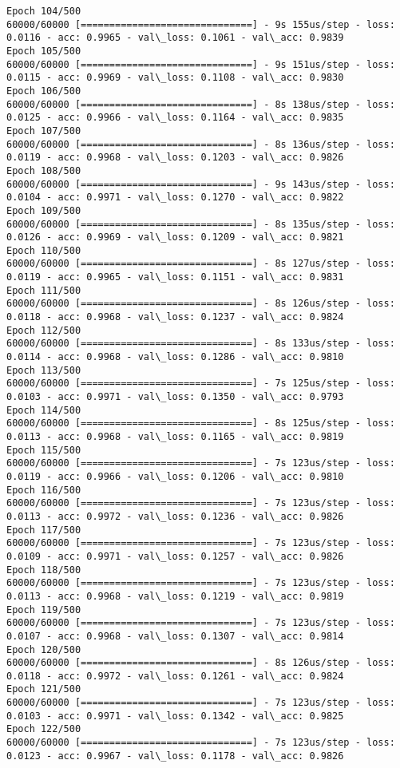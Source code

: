 \documentclass[11pt]{article}
\begin{document}
\begin{Verbatim}[commandchars=\\\{\}]
Epoch 104/500
60000/60000 [==============================] - 9s 155us/step - loss: 0.0116 - acc: 0.9965 - val\_loss: 0.1061 - val\_acc: 0.9839
Epoch 105/500
60000/60000 [==============================] - 9s 151us/step - loss: 0.0115 - acc: 0.9969 - val\_loss: 0.1108 - val\_acc: 0.9830
Epoch 106/500
60000/60000 [==============================] - 8s 138us/step - loss: 0.0125 - acc: 0.9966 - val\_loss: 0.1164 - val\_acc: 0.9835
Epoch 107/500
60000/60000 [==============================] - 8s 136us/step - loss: 0.0119 - acc: 0.9968 - val\_loss: 0.1203 - val\_acc: 0.9826
Epoch 108/500
60000/60000 [==============================] - 9s 143us/step - loss: 0.0104 - acc: 0.9971 - val\_loss: 0.1270 - val\_acc: 0.9822
Epoch 109/500
60000/60000 [==============================] - 8s 135us/step - loss: 0.0126 - acc: 0.9969 - val\_loss: 0.1209 - val\_acc: 0.9821
Epoch 110/500
60000/60000 [==============================] - 8s 127us/step - loss: 0.0119 - acc: 0.9965 - val\_loss: 0.1151 - val\_acc: 0.9831
Epoch 111/500
60000/60000 [==============================] - 8s 126us/step - loss: 0.0118 - acc: 0.9968 - val\_loss: 0.1237 - val\_acc: 0.9824
Epoch 112/500
60000/60000 [==============================] - 8s 133us/step - loss: 0.0114 - acc: 0.9968 - val\_loss: 0.1286 - val\_acc: 0.9810
Epoch 113/500
60000/60000 [==============================] - 7s 125us/step - loss: 0.0103 - acc: 0.9971 - val\_loss: 0.1350 - val\_acc: 0.9793
Epoch 114/500
60000/60000 [==============================] - 8s 125us/step - loss: 0.0113 - acc: 0.9968 - val\_loss: 0.1165 - val\_acc: 0.9819
Epoch 115/500
60000/60000 [==============================] - 7s 123us/step - loss: 0.0119 - acc: 0.9966 - val\_loss: 0.1206 - val\_acc: 0.9810
Epoch 116/500
60000/60000 [==============================] - 7s 123us/step - loss: 0.0113 - acc: 0.9972 - val\_loss: 0.1236 - val\_acc: 0.9826
Epoch 117/500
60000/60000 [==============================] - 7s 123us/step - loss: 0.0109 - acc: 0.9971 - val\_loss: 0.1257 - val\_acc: 0.9826
Epoch 118/500
60000/60000 [==============================] - 7s 123us/step - loss: 0.0113 - acc: 0.9968 - val\_loss: 0.1219 - val\_acc: 0.9819
Epoch 119/500
60000/60000 [==============================] - 7s 123us/step - loss: 0.0107 - acc: 0.9968 - val\_loss: 0.1307 - val\_acc: 0.9814
Epoch 120/500
60000/60000 [==============================] - 8s 126us/step - loss: 0.0118 - acc: 0.9972 - val\_loss: 0.1261 - val\_acc: 0.9824
Epoch 121/500
60000/60000 [==============================] - 7s 123us/step - loss: 0.0103 - acc: 0.9971 - val\_loss: 0.1342 - val\_acc: 0.9825
Epoch 122/500
60000/60000 [==============================] - 7s 123us/step - loss: 0.0123 - acc: 0.9967 - val\_loss: 0.1178 - val\_acc: 0.9826

\end{Verbatim}
\end{document}

